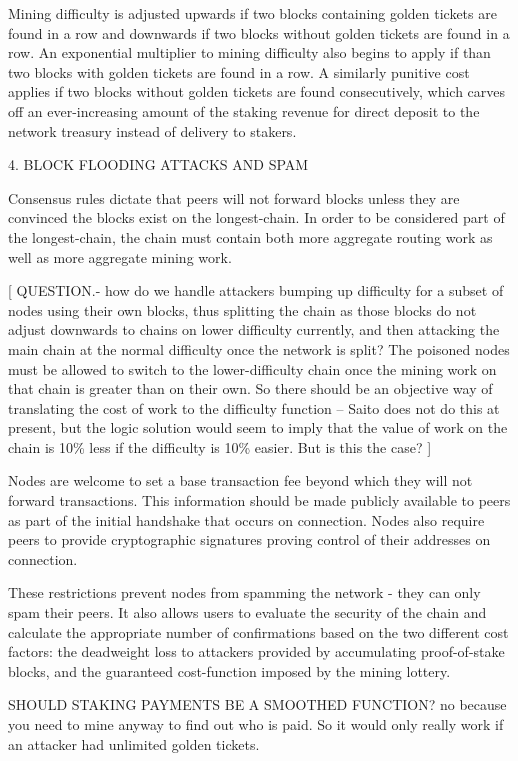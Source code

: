 \documentclass[11.5pt, oneside]{article}   	%
\begin{document}
\begin{multicols}{2}
Mining difficulty is adjusted upwards if two blocks containing golden tickets are found in a row and downwards if two blocks without golden tickets are found in a row. An exponential multiplier to mining difficulty also begins to apply if than two blocks with golden tickets are found in a row. A similarly punitive cost applies if two blocks without golden tickets are found consecutively, which carves off an ever-increasing amount of the staking revenue for direct deposit to the network treasury instead of delivery to stakers.

4. BLOCK FLOODING ATTACKS AND SPAM

Consensus rules dictate that peers will not forward blocks unless they are convinced the blocks exist on the longest-chain. In order to be considered part of the longest-chain, the chain must contain both more aggregate routing work as well as more aggregate mining work.

[ QUESTION.- how do we handle attackers bumping up difficulty for a subset of nodes using their own blocks, thus splitting the chain as those blocks do not adjust downwards to chains on lower difficulty currently, and then attacking the main chain at the normal difficulty once the network is split? The poisoned nodes must be allowed to switch to the lower-difficulty chain once the mining work on that chain is greater than on their own. So there should be an objective way of translating the cost of work to the difficulty function -- Saito does not do this at present, but the logic solution would seem to imply that the value of work on the chain is 10\% less if the difficulty is 10\% easier. But is this the case? ]

Nodes are welcome to set a base transaction fee beyond which they will not forward transactions. This information should be made publicly available to peers as part of the initial handshake that occurs on connection. Nodes also require peers to provide cryptographic signatures proving control of their addresses on connection.

These restrictions prevent nodes from spamming the network - they can only spam their peers. It also allows users to evaluate the security of the chain and calculate the appropriate number of confirmations based on the two different cost factors: the deadweight loss to attackers provided by accumulating proof-of-stake blocks, and the guaranteed cost-function imposed by the mining lottery.

SHOULD STAKING PAYMENTS BE A SMOOTHED FUNCTION? no because you need to mine anyway to find out who is paid. So it would only really work if an attacker had unlimited golden tickets.



\end{multicols}
\end{document}
